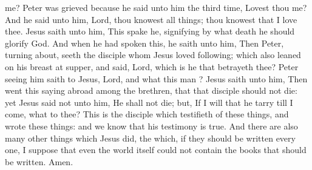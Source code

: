 {{{me?}}
Peter was
grieved
because he
said unto
him the third
time, Lovest
thou
me?
And he
said unto
him,
Lord,
thou
knowest all
things;
thou
knowest
that I
love
thee.
Jesus
saith unto
him,
{}
This spake
he,
signifying by
what
death he should
glorify
God.
And when he had
spoken
this, he
saith unto
him,
{}
Then
Peter, turning
about,
seeth the
disciple
whom
Jesus
loved
following;
which
also
leaned
on
his
breast
at
supper,
and
said,
Lord,
which
is he
that
betrayeth
thee?
Peter
seeing
him
saith to
Jesus,
Lord,
and
what
{} this
man
{}?
Jesus
saith unto
him,
{}
Then
went
this
saying
abroad
among the
brethren,
that
that
disciple
should
not
die:
yet
Jesus
said
not unto
him, He
shall
not
die;
but,
If I will
that
he
tarry
till I
come,
what
{}
to
thee?
This
is the
disciple
which
testifieth
of these
things,
and
wrote these
things:
and we
know
that
his
testimony
is
true.
And there
are
also
many other
things
which
Jesus
did, the
which,
if they should be
written
every
one, I suppose
that even the
world
itself
could
not
contain the
books that should be
written.
Amen.
\par }